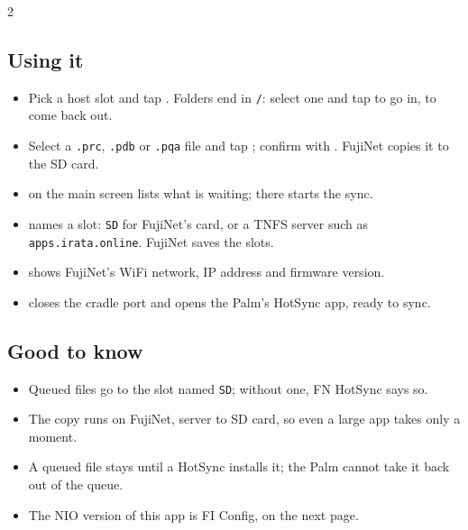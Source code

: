 \begin{multicols}{2}
\subsection*{Using it}
\begin{itemize}
  \item Pick a host slot and tap . Folders end in \texttt{/}: select
    one and tap  to go in,  to come back out.
  \item Select a \texttt{.prc}, \texttt{.pdb} or \texttt{.pqa} file and tap
    ; confirm with . FujiNet copies it to the SD card.
  \item {} on the main screen lists what is waiting;
     there starts the sync.
  \item {} names a slot: \texttt{SD} for FujiNet's card, or a TNFS
    server such as \texttt{apps.irata.online}. FujiNet saves the slots.
  \item {} shows FujiNet's WiFi network, IP address and firmware
    version.
  \item {} closes the cradle port and opens the Palm's HotSync
    app, ready to sync.
\end{itemize}

\subsection*{Good to know}
\begin{itemize}
  \item Queued files go to the slot named \texttt{SD}; without one, FN
    HotSync says so.
  \item The copy runs on FujiNet, server to SD card, so even a large app
    takes only a moment.
  \item A queued file stays until a HotSync installs it; the Palm cannot take
    it back out of the queue.
  \item The NIO version of this app is FI Config, on the next page.
\end{itemize}
\end{multicols}

\begin{center}
\hfill
{}\hfill
{}
\end{center}

